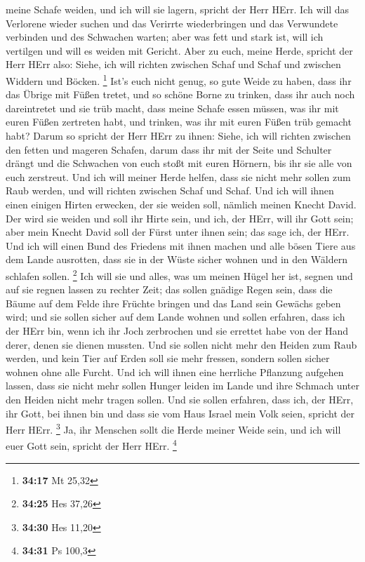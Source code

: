 meine Schafe weiden, und ich will sie lagern, spricht der Herr HErr.
 Ich will das Verlorene wieder suchen und das Verirrte
wiederbringen und das Verwundete verbinden und des Schwachen warten;
aber was fett und stark ist, will ich vertilgen und will es weiden mit
Gericht.  Aber zu euch, meine Herde, spricht der Herr
HErr also: Siehe, ich will richten zwischen Schaf und Schaf und zwischen
Widdern und Böcken. \footnote{\textbf{34:17} Mt 25,32} 
Ist's euch nicht genug, so gute Weide zu haben, dass ihr das Übrige mit
Füßen tretet, und so schöne Borne zu trinken, dass ihr auch noch
dareintretet und sie trüb macht,  dass meine Schafe essen
müssen, was ihr mit euren Füßen zertreten habt, und trinken, was ihr mit
euren Füßen trüb gemacht habt?  Darum so spricht der Herr
HErr zu ihnen: Siehe, ich will richten zwischen den fetten und mageren
Schafen,  darum dass ihr mit der Seite und Schulter
drängt und die Schwachen von euch stoßt mit euren Hörnern, bis ihr sie
alle von euch zerstreut.  Und ich will meiner Herde
helfen, dass sie nicht mehr sollen zum Raub werden, und will richten
zwischen Schaf und Schaf.  Und ich will ihnen einen
einigen Hirten erwecken, der sie weiden soll, nämlich meinen Knecht
David. Der wird sie weiden und soll ihr Hirte sein,  und
ich, der HErr, will ihr Gott sein; aber mein Knecht David soll der Fürst
unter ihnen sein; das sage ich, der HErr.  Und ich will
einen Bund des Friedens mit ihnen machen und alle bösen Tiere aus dem
Lande ausrotten, dass sie in der Wüste sicher wohnen und in den Wäldern
schlafen sollen. \footnote{\textbf{34:25} Hes 37,26}  Ich
will sie und alles, was um meinen Hügel her ist, segnen und auf sie
regnen lassen zu rechter Zeit; das sollen gnädige Regen sein,
 dass die Bäume auf dem Felde ihre Früchte bringen und
das Land sein Gewächs geben wird; und sie sollen sicher auf dem Lande
wohnen und sollen erfahren, dass ich der HErr bin, wenn ich ihr Joch
zerbrochen und sie errettet habe von der Hand derer, denen sie dienen
mussten.  Und sie sollen nicht mehr den Heiden zum Raub
werden, und kein Tier auf Erden soll sie mehr fressen, sondern sollen
sicher wohnen ohne alle Furcht.  Und ich will ihnen eine
herrliche Pflanzung aufgehen lassen, dass sie nicht mehr sollen Hunger
leiden im Lande und ihre Schmach unter den Heiden nicht mehr tragen
sollen.  Und sie sollen erfahren, dass ich, der HErr, ihr
Gott, bei ihnen bin und dass sie vom Haus Israel mein Volk seien,
spricht der Herr HErr. \footnote{\textbf{34:30} Hes 11,20}
 Ja, ihr Menschen sollt die Herde meiner Weide sein, und
ich will euer Gott sein, spricht der Herr HErr. \footnote{\textbf{34:31}
  Ps 100,3}

